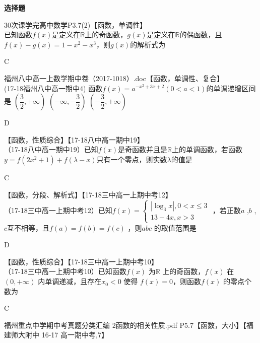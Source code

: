 \begin{exercise}{\bf 选择题}
    \item 30次课学完高中数学P3.7(2)【函数，单调性】\\
      已知函数$f(x)$是定义在$\mathbb{R}$上的奇函数，$g(x)$是定义在$\mathbb{R} $的偶函数，且$f(x)-g(x)=1-x^2-x^3 $，则$g(x) $的解析式为\xz
      \begin{answer}
        C
      \end{answer}
    \item 福州八中高一上数学期中卷（2017-1018）.doc【函数，单调性、复合】\\
      (17-18福州八中高一期中4)
      函数$f(x)=a^{-x^2+3x+2}(0<a<1)$的单调递增区间是\xz
        {$(\dfrac32,+\infty)$}
        {$(-\infty,-\dfrac32)$}
        {$(-\dfrac32,+\infty)$}
      \begin{answer}
        D
      \end{answer}
    \item 【函数，性质综合】【17-18八中高一期中19】\\
      （17-18八中高一期中19）已知$f(x)$是奇函数并且是$\mathbb{R}$上的单调函数，若函数$y=f(2x^2+1)+f(\lambda-x) $只有一个零点，则实数$\lambda $的值是\xz
      \begin{answer}
        C
      \end{answer}
    \item 【函数，分段、解析式】【17-18三中高一上期中考12】\\
      （17-18三中高一上期中考12）已知$f(x)=\begin{cases}
       |\log_3x|,0<x\leq3\\13-4x,x>3
      \end{cases} $ ，若正数$a$ ,$b$ , $c$互不相等，且$f(a)=f(b)=f(c)$ ，则$abc$ 的取值范围是\xz
      \begin{answer}
        D
      \end{answer}
    \item 【函数，性质综合】【17-18三中高一上期中考10】\\
      （17-18三中高一上期中考10）已知函数$f(x)$ 为$\mathbb{R}$ 上的奇函数，$f(x)$ 在$(0,+\infty)$ 内单调递减，且存在$x_0<0$ 使得 $f(x)=0$，则函数$f(x)$ 的零点个数为\xz
      \begin{answer}
        C
      \end{answer}
    \item 福州重点中学期中考真题分类汇编 2函数的相关性质.pdf P5.7【函数，大小】【福建师大附中 16-17 高一期中考,7】\\

\end{exercise}
